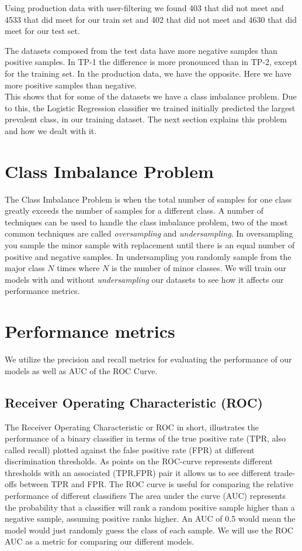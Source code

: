 Using production data with user-filtering we found 403 that did not meet and 4533 that did meet for our train set and 402 that did not meet and 4630 that did meet for our test set.

The datasets composed from the test data have more negative samples than positive samples. In TP-1 the difference is more pronounced than in TP-2, except for the training set. In the production data, we have the opposite. Here we have more positive samples than negative. \\
This shows that for some of the datasets we have a class imbalance problem. Due to this, the Logistic Regression classifier we trained initially predicted the largest prevalent class, in our training dataset. The next section explains this problem and how we dealt with it. 


\section{Class Imbalance Problem}
\label{sec:class_imbalance_problem}
The Class Imbalance Problem is when the total number of samples for one class greatly exceeds the number of samples for a different class. A number of techniques can be used to handle the class imbalance problem, two of the most common techniques are called \textit{oversampling} and \textit{undersampling}\cite{tan2006introduction}. In oversampling you sample the minor sample with replacement until there is an equal number of positive and negative samples. In undersampling you randomly sample from the major class $N$ times where $N$ is the number of minor classes. We will train our models with and without \textit{undersampling} our datasets to see how it affects our performance metrics.

\section{Performance metrics}
\label{sec:performance_metrics}
We utilize the precision and recall metrics for evaluating the performance of our models as well as AUC of the ROC Curve.

\subsection{Receiver Operating Characteristic (ROC)}
The Receiver Operating Characteristic or ROC in short, illustrates the performance of a binary classifier in terms of the true positive rate (TPR, also called recall) plotted against the false positive rate (FPR) at different discrimination thresholds. As points on the ROC-curve represents different thresholds with an associated (TPR,FPR) pair it allows us to see different trade-offs between TPR and FPR. The ROC curve is useful for comparing the relative performance of different classifiers\cite{tan2006introduction} The area under the curve (AUC) represents the probability that a classifier will rank a random positive sample higher than a negative sample, assuming positive ranks higher. An AUC of 0.5 would mean the model would just randomly guess the class of each sample. We will use the ROC AUC as a metric for comparing our different models.

